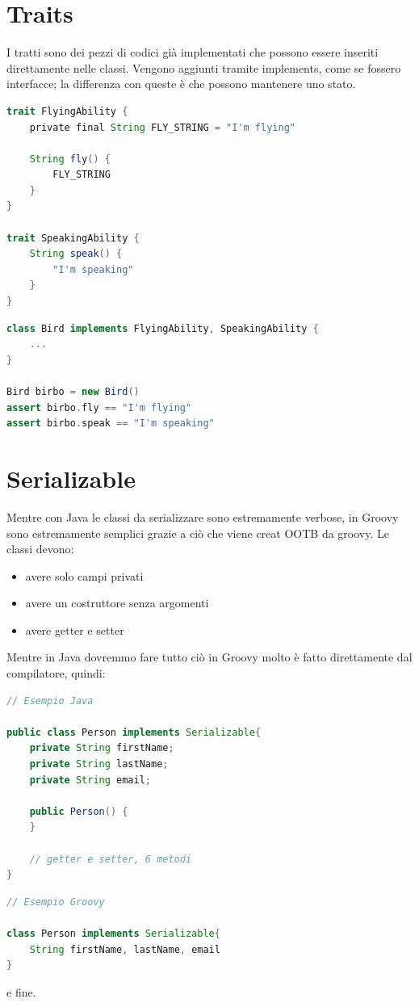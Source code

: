 \documentclass[11pt,a4paper]{book}
\begin{document}
\section{Traits}
I tratti sono dei pezzi di codici già implementati che possono essere inseriti direttamente nelle classi. Vengono aggiunti tramite implements, come se fossero interfacce; la differenza con queste è che possono mantenere uno stato.
\begin{lstlisting}[language = groovy]
trait FlyingAbility {
	private final String FLY_STRING = "I'm flying"	
	
	String fly() {
		FLY_STRING
	}
}

trait SpeakingAbility {
	String speak() {
		"I'm speaking"
	}
}
\end{lstlisting}
\begin{lstlisting}[language = groovy]
class Bird implements FlyingAbility, SpeakingAbility {
	...
}

Bird birbo = new Bird()
assert birbo.fly == "I'm flying"
assert birbo.speak == "I'm speaking"
\end{lstlisting}

\section{Serializable}
Mentre con Java le classi da serializzare sono estremamente verbose, in Groovy sono estremamente semplici grazie a ciò che viene creat OOTB da groovy. Le classi devono:
\begin{itemize}
	\item avere solo campi privati
	\item avere un costruttore senza argomenti
	\item avere getter e setter
\end{itemize}

Mentre in Java dovremmo fare tutto ciò in Groovy molto è fatto direttamente dal compilatore, quindi:
\begin{lstlisting}[language = java]
// Esempio Java

public class Person implements Serializable{
	private String firstName;
	private String lastName;
	private String email;
	
	public Person() {
	}
	
	// getter e setter, 6 metodi
}
\end{lstlisting}
\begin{lstlisting}[language = groovy]
// Esempio Groovy

class Person implements Serializable{
	String firstName, lastName, email
}
\end{lstlisting}
e fine.
\end{document}
